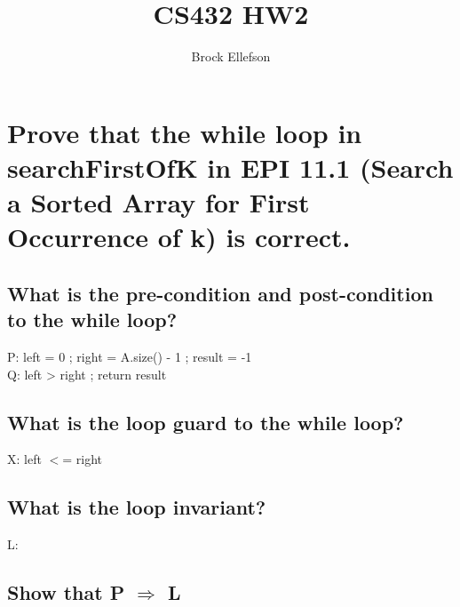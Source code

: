 \documentclass[10pt,letterpaper]{article}
\author{Brock Ellefson}
\title{CS432 HW2}
\begin{document}
\section{Prove that the while loop
in searchFirstOfK in EPI 11.1 (Search a Sorted
Array for First Occurrence of k) is correct.
}

\subsection{What is the pre-condition and post-condition
to the while loop?}
P: left = 0 ; right = A.size() - 1 ; result = -1 \\
Q: left > right ; return result \\

\subsection{What is the loop guard to the while loop?}
X: left $<$= right
\subsection{What is the loop invariant?}
L: 
\subsection{Show that P $\Rightarrow$ L}
\end{document}
